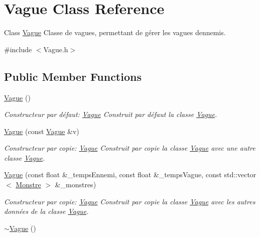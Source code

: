 \hypertarget{classVague}{}\section{Vague Class Reference}
\label{classVague}


Class \hyperlink{classVague}{Vague} Classe de vagues, permettant de gérer les vagues d\textquotesingle{}ennemis.  




{\ttfamily \#include $<$Vague.\+h$>$}

\subsection*{Public Member Functions}
\begin{DoxyCompactItemize}
\item 
\hyperlink{classVague_ab1e4786aa02ad641431b56658dbbaac3}{Vague} ()
\begin{DoxyCompactList}\small\item\em Constructeur par défaut\+: \hyperlink{classVague}{Vague} Construit par défaut la classe \hyperlink{classVague}{Vague}. \end{DoxyCompactList}\item 
\hyperlink{classVague_aa1c2e536319c3b66880a5d7dd7cbb444}{Vague} (const \hyperlink{classVague}{Vague} \&v)
\begin{DoxyCompactList}\small\item\em Constructeur par copie\+: \hyperlink{classVague}{Vague} Construit par copie la classe \hyperlink{classVague}{Vague} avec une autre classe \hyperlink{classVague}{Vague}. \end{DoxyCompactList}\item 
\hyperlink{classVague_a676fd5a235236ec1bb0b9b6a974c3296}{Vague} (const float \&\+\_\+temps\+Ennemi, const float \&\+\_\+temps\+Vague, const std\+::vector$<$ \hyperlink{classMonstre}{Monstre} $>$ \&\+\_\+monstres)
\begin{DoxyCompactList}\small\item\em Constructeur par copie\+: \hyperlink{classVague}{Vague} Construit par copie la classe \hyperlink{classVague}{Vague} avec les autres données de la classe \hyperlink{classVague}{Vague}. \end{DoxyCompactList}\item 
\mbox{\label{classVague_a72eb74bd6b6cc6de266fa4b8f77e56d4}} 
\hyperlink{classVague_a72eb74bd6b6cc6de266fa4b8f77e56d4}{$\sim$\+Vague} ()

\end{DoxyCompactItemize}
